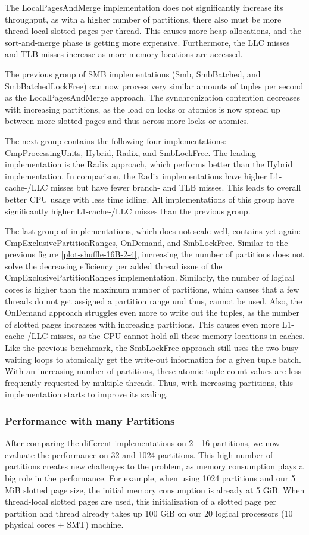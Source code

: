 The Local\-Pages\-And\-Merge implementation does not significantly increase its throughput, as with a higher number of partitions, there also must be more thread-local slotted pages per thread.
This causes more heap allocations, and the sort-and-merge phase is getting more expensive.
Furthermore, the \ac{LLC} misses and \ac{TLB} misses increase as more memory locations are accessed.

The previous group of SMB implementations (Smb, Smb\-Batched, and Smb\-BatchedLockFree) can now process very similar amounts of tuples per second as the Local\-Pages\-And\-Merge approach.
The synchronization contention decreases with increasing partitions, as the load on locks or atomics is now spread up between more slotted pages and thus across more locks or atomics.

The next group contains the following four implementations: CmpProcessingUnits, Hybrid, Radix, and Smb\-Lock\-Free.
The leading implementation is the Radix approach, which performs better than the Hybrid implementation.
In comparison, the Radix implementations have higher L1-cache-/LLC misses but have fewer branch- and TLB misses.
This leads to overall better CPU usage with less time idling.
All implementations of this group have significantly higher L1-cache-/LLC misses than the previous group.

The last group of implementations, which does not scale well, contains yet again: CmpExclusivePartitionRanges, OnDemand, and Smb\-Lock\-Free.
Similar to the previous figure \ref{plot-shuffle-16B-2-4}, increasing the number of partitions does not solve the decreasing efficiency per added thread issue of the CmpExclusivePartitionRanges implementation.
Similarly, the number of logical cores is higher than the maximum number of partitions, which causes that a few threads do not get assigned a partition range und thus, cannot be used.
Also, the OnDemand approach struggles even more to write out the tuples, as the number of slotted pages increases with increasing partitions.
This causes even more L1-cache-/LLC misses, as the \ac{CPU} cannot hold all these memory locations in caches.
Like the previous benchmark, the Smb\-Lock\-Free approach still uses the two busy waiting loops to atomically get the write-out information for a given tuple batch.
With an increasing number of partitions, these atomic tuple-count values are less frequently requested by multiple threads.
Thus, with increasing partitions, this implementation starts to improve its scaling.
\subsubsection{Performance with many Partitions}
After comparing the different implementations on 2 - 16 partitions, we now evaluate the performance on 32 and 1024 partitions.
This high number of partitions creates new challenges to the problem, as memory consumption plays a big role in the performance.
For example, when using 1024 partitions and our 5 MiB slotted page size, the initial memory consumption is already at 5 GiB.
When thread-local slotted pages are used, this initialization of a slotted page per partition and thread already takes up 100 GiB on our 20 logical processors (10 physical cores + SMT) machine.

